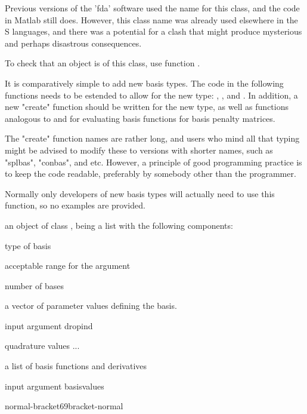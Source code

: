 \documentclass{article}
\begin{document}
\begin{Details}\relax
Previous versions of the 'fda' software used the name 
for this class, and the code in Matlab still does.  However, this
class name was already used elsewhere in the S languages, and there
was a potential for a clash that might produce mysterious and perhaps
disastrous consequences.

To check that an object is of this class, use function
.

It is comparatively simple to add new basis types.  The code in
the following functions needs to be estended to allow for the new
type: , ,
 and .
In addition, a new "create" function should be written for the
new type, as well as functions analogous to  and
 for evaluating basis functions for basis
penalty matrices.

The "create" function names are rather long, and users who mind
all that typing might be advised to modify these to versions with
shorter names, such as "splbas", "conbas", and etc.  However, a
principle of good programming practice is to keep the code readable,
preferably by somebody other than the programmer.

Normally only developers of new basis types will actually need
to use this function, so no examples are provided.
\end{Details}
\begin{Value}
an object of class , being a list with the following
components:

\begin{ldescription}
\item[\code{type}] type of basis
\item[\code{rangeval}] acceptable range for the argument
\item[\code{nbasis}] number of bases
\item[\code{params}] a vector of parameter values defining the basis.

\item[\code{dropind}] input argument dropind
\item[\code{quadvals}] quadrature values ...
\item[\code{values}] a list of basis functions and derivatives

\item[\code{basisvalues}] input argument basisvalues
\end{ldescription}

normal-bracket69bracket-normal
\end{Value}
\end{document}
